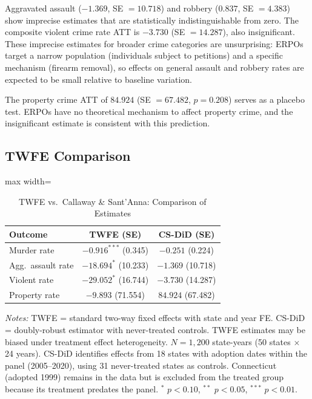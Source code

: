 \documentclass[12pt]{article}
\begin{document}
Aggravated assault ($-1.369$, SE $= 10.718$) and robbery ($0.837$, SE $= 4.383$) show imprecise estimates that are statistically indistinguishable from zero. The composite violent crime rate ATT is $-3.730$ (SE $= 14.287$), also insignificant. These imprecise estimates for broader crime categories are unsurprising: ERPOs target a narrow population (individuals subject to petitions) and a specific mechanism (firearm removal), so effects on general assault and robbery rates are expected to be small relative to baseline variation.

The property crime ATT of $84.924$ (SE $= 67.482$, $p = 0.208$) serves as a placebo test. ERPOs have no theoretical mechanism to affect property crime, and the insignificant estimate is consistent with this prediction.

\subsection{TWFE Comparison}

\begin{table}[H]
\centering
\caption{TWFE vs.\ Callaway \& Sant'Anna: Comparison of Estimates}
\label{tab:twfe_comp}
\begin{adjustbox}{max width=\textwidth}
\begin{threeparttable}
\begin{tabular}{lcc}
\toprule
Outcome & TWFE (SE) & CS-DiD (SE) \\
\midrule
Murder rate & $-0.916^{***}$ (0.345) & $-0.251$ (0.224) \\
Agg.\ assault rate & $-18.694^{*}$ (10.233) & $-1.369$ (10.718) \\
Violent rate & $-29.052^{*}$ (16.744) & $-3.730$ (14.287) \\
Property rate & $-9.893$ (71.554) & $84.924$ (67.482) \\
\bottomrule
\end{tabular}
\begin{tablenotes}[flushleft]
\small
\item \textit{Notes:} TWFE = standard two-way fixed effects with state and year FE. CS-DiD = \citet{callaway2021difference} doubly-robust estimator with never-treated controls. TWFE estimates may be biased under treatment effect heterogeneity. $N = 1{,}200$ state-years (50 states $\times$ 24 years). CS-DiD identifies effects from 18 states with adoption dates within the panel (2005--2020), using 31 never-treated states as controls. Connecticut (adopted 1999) remains in the data but is excluded from the treated group because its treatment predates the panel. $^{*}$ $p<0.10$, $^{**}$ $p<0.05$, $^{***}$ $p<0.01$.
\end{tablenotes}
\end{threeparttable}
\end{adjustbox}
\end{table}
\end{document}
